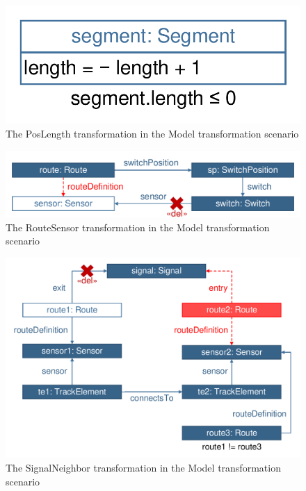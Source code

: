 \begin{figure}[!Htb]
	\centering
	\includegraphics[scale=0.4]{figures/trainbenchmark-transformation-xform-poslength}
	\caption{The \textsf{PosLength} transformation in the Model transformation scenario}
	\label{fig:trainbenchmark-transformation-xform-poslength}
\end{figure}

\begin{figure}[!Htb]
	\centering
	\includegraphics[scale=0.4]{figures/trainbenchmark-transformation-xform-routesensor}
	\caption{The \textsf{RouteSensor} transformation in the Model transformation scenario}
	\label{fig:trainbenchmark-transformation-xform-routesensor}
\end{figure}

\begin{figure}[!Htb]
	\centering
	\includegraphics[scale=0.4]{figures/trainbenchmark-transformation-xform-signalneighbor}
	\caption{The \textsf{SignalNeighbor} transformation in the Model transformation scenario}
	\label{fig:trainbenchmark-transformation-xform-signalneighbor}
\end{figure}

